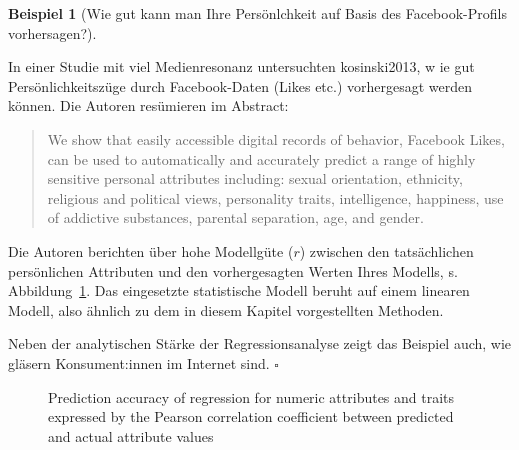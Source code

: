 \documentclass[
  letterpaper,
]{scrbook}
\theoremstyle{definition}
\theoremstyle{definition}
\newtheorem{example}{Beispiel}[chapter]
\theoremstyle{definition}
\theoremstyle{remark}
\begin{document}
\begin{example}[Wie gut kann man Ihre Persönlchkeit auf Basis des
Facebook-Profils
vorhersagen?]\protect\hypertarget{exm-kosinski}{}\label{exm-kosinski}

In einer Studie mit viel Medienresonanz untersuchten kosinski2013, w ie
gut Persönlichkeitszüge durch Facebook-Daten (Likes etc.) vorhergesagt
werden können. Die Autoren resümieren im Abstract:

\begin{quote}
We show that easily accessible digital records of behavior, Facebook
Likes, can be used to automatically and accurately predict a range of
highly sensitive personal attributes including: sexual orientation,
ethnicity, religious and political views, personality traits,
intelligence, happiness, use of addictive substances, parental
separation, age, and gender.
\end{quote}

Die Autoren berichten über hohe Modellgüte (\(r\)) zwischen den
tatsächlichen persönlichen Attributen und den vorhergesagten Werten
Ihres Modells, s. Abbildung~\ref{fig-pnas1}. Das eingesetzte
statistische Modell beruht auf einem linearen Modell, also ähnlich zu
dem in diesem Kapitel vorgestellten Methoden.

Neben der analytischen Stärke der Regressionsanalyse zeigt das Beispiel
auch, wie gläsern Konsument:innen im Internet sind. \(\square\)

\end{example}

\begin{figure}


\caption{\label{fig-pnas1}Prediction accuracy of regression for numeric
attributes and traits expressed by the Pearson correlation coefficient
between predicted and actual attribute values}

\end{figure}%
\end{document}
